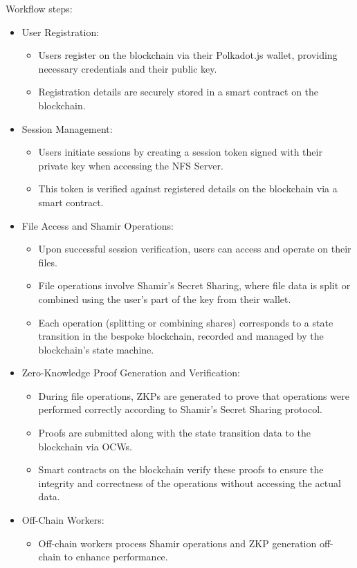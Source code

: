 \documentclass{tufte-handout}
\begin{document}
Workflow steps:
\begin{itemize}
\item User Registration:
\begin{itemize}
\item Users register on the blockchain via their Polkadot.js wallet, providing necessary credentials and their public key.
\item Registration details are securely stored in a smart contract on the blockchain.
\end{itemize}
\item Session Management:
\begin{itemize}
\item Users initiate sessions by creating a session token signed with their private key when accessing the NFS Server.
\item This token is verified against registered details on the blockchain via a smart contract.
\end{itemize}
\item File Access and Shamir Operations:
\begin{itemize}
\item Upon successful session verification, users can access and operate on their files.
\item File operations involve Shamir's Secret Sharing, where file data is split or combined using the user's part of the key from their wallet.
\item Each operation (splitting or combining shares) corresponds to a state transition in the bespoke blockchain, recorded and managed by the blockchain's state machine.
\end{itemize}
\item Zero-Knowledge Proof Generation and Verification:
\begin{itemize}
\item During file operations, ZKPs are generated to prove that operations were performed correctly according to Shamir's Secret Sharing protocol.
\item Proofs are submitted along with the state transition data to the blockchain via OCWs.
\item Smart contracts on the blockchain verify these proofs to ensure the integrity and correctness of the operations without accessing the actual data.
\end{itemize}
\item Off-Chain Workers:
\begin{itemize}
\item Off-chain workers process Shamir operations and ZKP generation off-chain to enhance performance.

\end{itemize}
\end{itemize}
\end{document}
